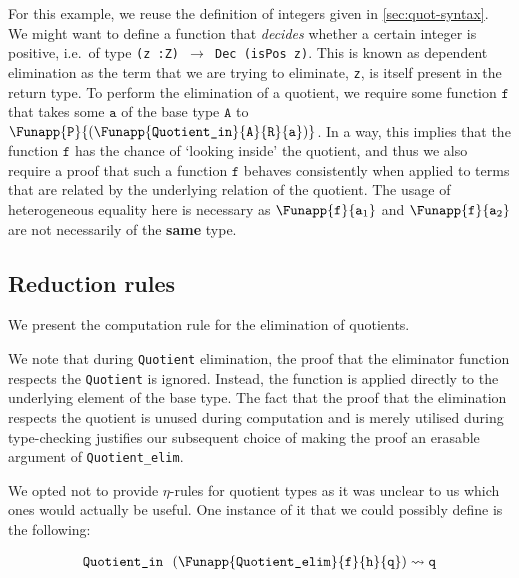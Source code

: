 \documentclass[12pt,twoside,maitrise]{dms}
\theoremstyle{definition}
\numberwithin{equation}{section}
\numberwithin{table}{chapter}
\numberwithin{figure}{chapter}
\newcommand\id[1] {\texttt{#1}}
\newcommand\fn[1] {\texttt{#1}}
\begin{document}
For this example, we reuse the definition of integers given in
\autoref{sec:quot-syntax}. We might want to define a function that
\emph{decides} whether a certain integer is positive, i.e.\ of type \fn{(z
  :\@ Z) $\rightarrow$ Dec (isPos z)}. This is known as dependent
elimination as the term that we are trying to eliminate, \id{z}, is itself
present in the return type. To perform the elimination of a quotient, we require
some function $\id{f}$ that takes some $\id{a}$ of the base type $\id{A}$ to
$\Funapp{\id{P}}{(\Funapp{\id{Quotient\_in}}{\id{A}}{\id{R}}{\id{a}})}$. In a
way, this implies that the function $\id{f}$ has the chance of `looking inside'
the quotient, and thus we also require a proof that such a function $\id{f}$
behaves consistently when applied to terms that are related by the underlying
relation of the quotient. The usage of heterogeneous equality here is necessary
as $\Funapp{\id{f}}{\id{a}_1}$ and $\Funapp{\id{f}}{\id{a}_2}$ are not
necessarily of the \textbf{same} type.

\subsection{Reduction rules}\label{quot-red-rules}
We present the computation rule for the elimination of quotients.

\begin{prooftree*}
   \infer0{\id{Quotient\_elim} \ \ \id{f} \ \ \id{p}
     \ \ (\id{Quotient\_in} \ \ \id{R} \ \ \id{a}) \rightsquigarrow
     \Funapp{\id{f}}{\id{a}}}
\end{prooftree*}

We note that during \id{Quotient} elimination, the proof that the eliminator
function respects the \id{Quotient} is ignored. Instead, the function is applied
directly to the underlying element of the base type. The fact that the proof
that the elimination respects the quotient is unused during computation and is
merely utilised during type-checking justifies our subsequent choice of making
the proof an erasable argument of \id{Quotient\_elim}.

We opted not to provide $\eta$-rules for quotient types as it was unclear to us
which ones would actually be useful. One instance of it that we could possibly
define is the following:

\begin{align*}
  & \id{Quotient\_in} \ \ (\Funapp{\fn{Quotient\_elim}}{\id{f}}{\id{h}}{\id{q}}) \rightsquigarrow{} \id{q} \\
\end{align*}
\end{document}
